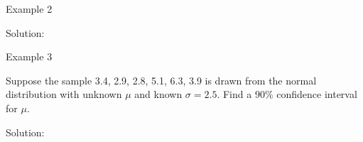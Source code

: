 \documentclass[
  ignorenonframetext,
]{beamer}
\begin{document}
\begin{frame}{Example 2}
\protect\hypertarget{example-2-1}{}
\begin{tcolorbox}
Solution: 

\vspace{30mm}

\end{tcolorbox}
\end{frame}

\begin{frame}{Example 3}
\protect\hypertarget{example-3}{}
\begin{tcolorbox}
 Suppose the sample 3.4, 2.9, 2.8, 5.1, 6.3, 3.9 is drawn from the normal distribution with unknown $\mu$ and known $\sigma=2.5$. Find a $90\%$ confidence interval for $\mu$.
\end{tcolorbox}

\begin{tcolorbox}
Solution: 

\vspace{30mm}


\end{tcolorbox}
\end{frame}
\end{document}
